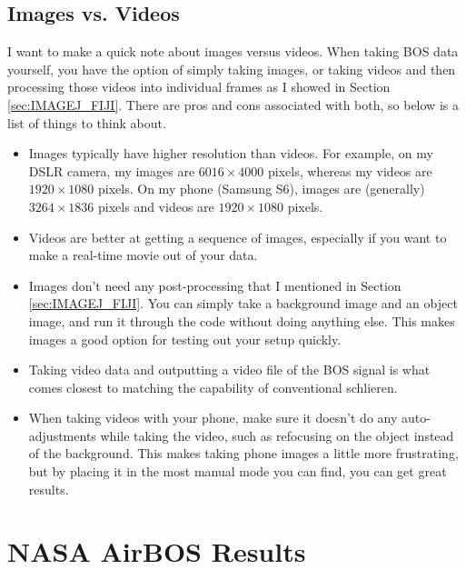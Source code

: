 \documentclass[letterpaper,12pt]{article}
\begin{document}
\subsection{Images vs. Videos}
\label{subsec:Images_vs_Videos}

I want to make a quick note about images versus videos.  When taking BOS data yourself, you have the option of simply taking images, or taking videos and then processing those videos into individual frames as I showed in Section \ref{sec:IMAGEJ_FIJI}.  There are pros and cons associated with both, so below is a list of things to think about.

\begin{itemize}
\item Images typically have higher resolution than videos.  For example, on my DSLR camera, my images are $6016 \times 4000$ pixels, whereas my videos are $1920 \times 1080$ pixels.  On my phone (Samsung S6), images are (generally) $3264 \times 1836$ pixels and videos are $1920 \times 1080$ pixels.
\item Videos are better at getting a sequence of images, especially if you want to make a real-time movie out of your data.
\item Images don't need any post-processing that I mentioned in Section \ref{sec:IMAGEJ_FIJI}.  You can simply take a background image and an object image, and run it through the code without doing anything else.  This makes images a good option for testing out your setup quickly.
\item Taking video data and outputting a video file of the BOS signal is what comes closest to matching the capability of conventional schlieren.
\item When taking videos with your phone, make sure it doesn't do any auto-adjustments while taking the video, such as refocusing on the object instead of the background.  This makes taking phone images a little more frustrating, but by placing it in the most manual mode you can find, you can get great results.
\end{itemize}

\section{NASA AirBOS Results}
\label{sec:NASA_AirBOS_Results}
\end{document}

